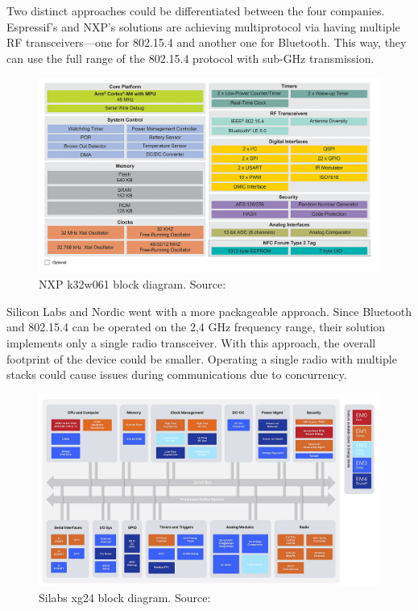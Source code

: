 Two distinct approaches could be differentiated between the four companies. Espressif's and NXP's solutions are achieving multiprotocol via having multiple RF transceivers—one for 802.15.4 and another one for Bluetooth. This way, they can use the full range of the 802.15.4 protocol with sub-GHz transmission.

\begin{figure}
    \centering
    \includegraphics[width=140mm, keepaspectratio]{figures/nxp_k32w061_41-block-dia.png}
    \caption{NXP k32w061 block diagram. Source: \cite{nxp}}
    \label{fig:mp:nxp-dia}
\end{figure}

Silicon Labs and Nordic went with a more packageable approach. Since Bluetooth and 802.15.4 can be operated on the 2,4 GHz frequency range, their solution implements only a single radio transceiver. With this approach, the overall footprint of the device could be smaller. Operating a single radio with multiple stacks could cause issues during communications due to concurrency.

\begin{figure}
    \centering
    \includegraphics[width=120mm, keepaspectratio]{figures/silabs_xg24-block-diagram.png}
    \caption{Silabs xg24 block diagram. Source: \cite{mg24}}
    \label{fig:mp:silabs-dia}
\end{figure}


